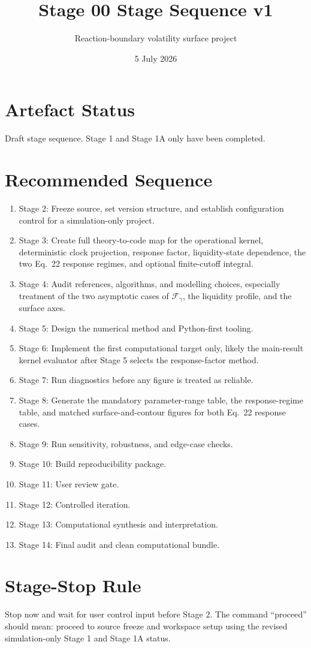 \documentclass[11pt]{article}
\title{Stage 00 Stage Sequence v1}
\author{Reaction-boundary volatility surface project}
\date{5 July 2026}
\begin{document}
\maketitle

\section*{Artefact Status}
Draft stage sequence. Stage 1 and Stage 1A only have been completed.

\section*{Recommended Sequence}
\begin{enumerate}
  \item Stage 2: Freeze source, set version structure, and establish
  configuration control for a simulation-only project.
  \item Stage 3: Create full theory-to-code map for the operational kernel,
  deterministic clock projection, response factor, liquidity-state
  dependence, the two Eq.~22 response regimes, and optional finite-cutoff
  integral.
  \item Stage 4: Audit references, algorithms, and modelling choices,
  especially treatment of the two asymptotic cases of \(\mathcal F_\gamma\),
  the liquidity profile, and the surface axes.
  \item Stage 5: Design the numerical method and Python-first tooling.
  \item Stage 6: Implement the first computational target only, likely the
  main-result kernel evaluator after Stage 5 selects the response-factor
  method.
  \item Stage 7: Run diagnostics before any figure is treated as reliable.
  \item Stage 8: Generate the mandatory parameter-range table, the
  response-regime table, and matched surface-and-contour figures for both
  Eq.~22 response cases.
  \item Stage 9: Run sensitivity, robustness, and edge-case checks.
  \item Stage 10: Build reproducibility package.
  \item Stage 11: User review gate.
  \item Stage 12: Controlled iteration.
  \item Stage 13: Computational synthesis and interpretation.
  \item Stage 14: Final audit and clean computational bundle.
\end{enumerate}

\section*{Stage-Stop Rule}
Stop now and wait for user control input before Stage 2. The command
``proceed'' should mean: proceed to source freeze and workspace setup using
the revised simulation-only Stage 1 and Stage 1A status.
\end{document}
